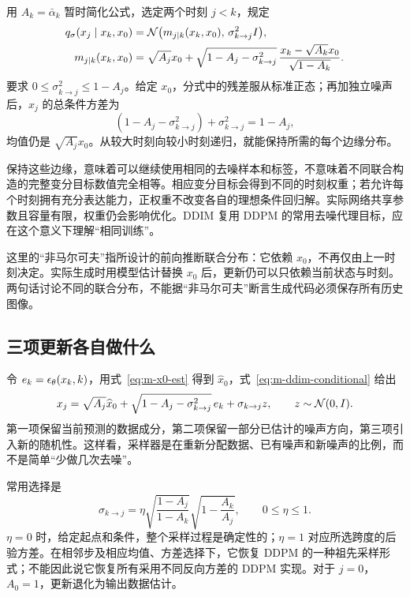 用 $A_k=\bar\alpha_k$ 暂时简化公式，选定两个时刻 $j<k$，规定
\begin{align}
q_\sigma(x_j\mid x_k,x_0)
 &=\mathcal{N}\bigl(m_{j\mid k}(x_k,x_0),\,\sigma_{k\to j}^2I\bigr),\\
m_{j\mid k}(x_k,x_0)
 &=\sqrt{A_j}x_0
 +\sqrt{1-A_j-\sigma_{k\to j}^2}\,
 \frac{x_k-\sqrt{A_k}x_0}{\sqrt{1-A_k}}.
\label{eq:m-ddim-conditional}
\end{align}
要求 $0\leq\sigma_{k\to j}^2\leq1-A_j$。给定 $x_0$，分式中的残差服从标准正态；再加独立噪声后，$x_j$ 的总条件方差为
\[
 (1-A_j-\sigma_{k\to j}^2)+\sigma_{k\to j}^2=1-A_j,
\]
均值仍是 $\sqrt{A_j}x_0$。从较大时刻向较小时刻递归，就能保持所需的每个边缘分布。

保持这些边缘，意味着可以继续使用相同的去噪样本和标签，不意味着不同联合构造的完整变分目标数值完全相等。相应变分目标会得到不同的时刻权重；若允许每个时刻拥有充分表达能力，正权重不改变各自的理想条件回归解。实际网络共享参数且容量有限，权重仍会影响优化。DDIM 复用 DDPM 的常用去噪代理目标，应在这个意义下理解“相同训练”。

这里的“非马尔可夫”指所设计的前向推断联合分布：它依赖 $x_0$，不再仅由上一时刻决定。实际生成时用模型估计替换 $x_0$ 后，更新仍可以只依赖当前状态与时刻。两句话讨论不同的联合分布，不能据“非马尔可夫”断言生成代码必须保存所有历史图像。

\subsection{三项更新各自做什么}

令 $e_k=\epsilon_\theta(x_k,k)$，用式~\eqref{eq:m-x0-est} 得到 $\widehat x_0$，式~\eqref{eq:m-ddim-conditional} 给出
\begin{equation}
x_j=\sqrt{A_j}\widehat x_0
 +\sqrt{1-A_j-\sigma_{k\to j}^2}\,e_k
 +\sigma_{k\to j}z,\qquad z\sim\mathcal{N}(0,I).
\label{eq:m-ddim-step}
\end{equation}
第一项保留当前预测的数据成分，第二项保留一部分已估计的噪声方向，第三项引入新的随机性。这样看，采样器是在重新分配数据、已有噪声和新噪声的比例，而不是简单“少做几次去噪”。

常用选择是
\begin{equation}
\sigma_{k\to j}=
\eta\sqrt{\frac{1-A_j}{1-A_k}}
\sqrt{1-\frac{A_k}{A_j}},\qquad 0\leq\eta\leq1.
\label{eq:m-ddim-eta}
\end{equation}
$\eta=0$ 时，给定起点和条件，整个采样过程是确定性的；$\eta=1$ 对应所选跨度的后验方差。在相邻步及相应均值、方差选择下，它恢复 DDPM 的一种祖先采样形式；不能因此说它恢复所有采用不同反向方差的 DDPM 实现。对于 $j=0$，$A_0=1$，更新退化为输出数据估计。

